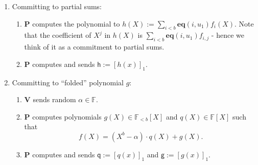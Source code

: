 \documentclass[11pt]{article} %
\newcommand{\F}{\ensuremath{\mathbb F}\xspace}
\newcommand{\defeq}{:=}
\newcommand{\enc}[1]{\ensuremath{\left[#1\right]_1}\xspace}
\newcommand{\prv}{\ensuremath{\mathsf{\mathbf{P}}}\xspace}
\newcommand{\ver}{\ensuremath{\mathsf{\mathbf{V}}}\xspace}
\newcommand{\polysofdeg}[1]{\ensuremath{\F_{< #1}[X]}\xspace}
\newcommand{\polys}{\ensuremath{\F[X]}\xspace}
\newcommand{\sumi}[1]{\sum_{i< #1}}
\newcommand{\h}{\ensuremath{\mathsf{h}}\xspace}
\renewcommand{\g}{\ensuremath{\mathsf{g}}\xspace}
\newcommand{\q}{\ensuremath{\mathsf{q}}\xspace}
\newcommand{\eq}{\ensuremath{\mathsf{eq}}\xspace}
\renewcommand{\eq}{\ensuremath{\mathbf{eq}}\xspace}
\begin{document}
\begin{enumerate}
 \item \textsf{Committing to partial sums:} \ 
\begin{enumerate}
 \item \prv computes the polynomial to $h(X)\defeq \sumi{b}\eq(i,u_1) f_i(X)$. Note that the coefficient of $X^j$ in $h(X)$ is $\sumi{b}\eq(i,u_1) f_{i,j}$ - hence we think of it as a commitment to partial sums. 
 \item \prv computes and sends $\h\defeq\enc{h(x)}$.
 
 \end{enumerate}
\item \textsf{ Committing to  ``folded'' polynomial $g$:} 
\begin{enumerate}
 \item \ver sends random $\alpha \in \F$.
\item \prv computes polynomials $g(X) \in \polysofdeg{b}$ and $q(X)\in \polys$ such that
\[f(X)=(X^b-\alpha)\cdot q(X) + g(X).\]\label{step:modalpha}
\item \prv computes and sends $\q\defeq \enc{q(x)}$ and $\g\defeq \enc{g(x)}$.

\end{enumerate}


\end{enumerate}
\end{document}
